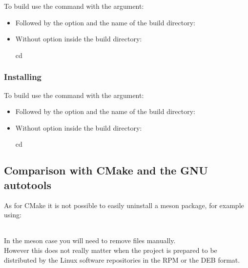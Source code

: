 To build use the  command with the  argument: 
\begin{itemize}
\item Followed by the option  and the name of the build directory:
\begin{scripti}
    
\end{scripti}
\item Without option inside the build directory:
\begin{scripti}
 cd 
  
\end{scripti}
\end{itemize}

\subsubsection*{Installing}

To build use the  command with the  argument: 
\begin{itemize}
\item Followed by the option  and the name of the build directory:
\begin{scripti}
     
\end{scripti}
\item Without option inside the build directory:
\begin{scripti}
 cd 
   
\end{scripti}
\end{itemize}


\subsection{Comparison with CMake and the GNU autotools}

As for CMake it is not possible to easily uninstall a meson package, for example using: 
\begin{script}
   
\end{script}
\\[-0.5cm]
In the meson case you will need to remove files manually. \\[0.25cm]
However this does not really matter when the project is prepared to be distributed by the Linux software repositories in the RPM or the DEB format. 

